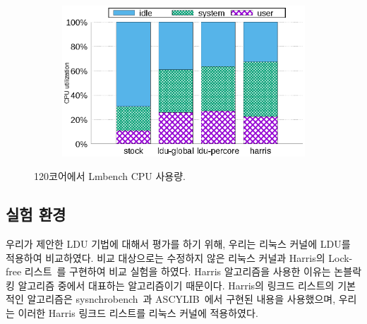 \begin{figure}[tb]
    \centering
    \begin{subfigure}[b]{1\textwidth}
  \begin{center}
        \includegraphics[scale=0.8]{graph/lmbench_cpuutils.eps}
  \end{center}
    \end{subfigure}
        \centering
    \caption{120코어에서 Lmbench CPU 사용량.}
    \label{fig:utilization_lmbench}
    
\end{figure}



\subsection{실험 환경}



우리가 제안한 LDU 기법에 대해서 평가를 하기 위해, 우리는 리눅스 커널에 LDU를 적용하여 비교하였다.
비교 대상으로는 수정하지 않은 리눅스 커널과 Harris의 Lock-free 리스트~\cite{Harris2001Lockfree}를
 구현하여 비교 실험을 하였다.
Harris 알고리즘을 사용한 이유는 논블락킹 알고리즘 중에서 대표하는 알고리즘이기 때문이다. 
Harris의 링크드 리스트의 기본적인 알고리즘은 sysnchrobench~\cite{Gramoli2015Synchrobench}과
ASCYLIB~\cite{David2015ASYNCHRONIZED}에서 구현된 내용을 사용했으며, 우리는 이러한 Harris 링크드 
리스트를  리눅스 커널에 적용하였다. 

